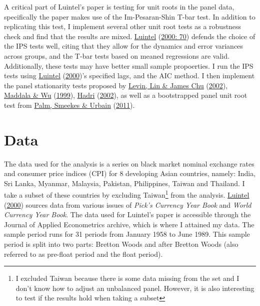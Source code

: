 \documentclass[11pt,preprint, authoryear]{elsarticle}
\numberwithin{equation}{section}
\numberwithin{figure}{section}
\numberwithin{table}{section}
\let\rmarkdownfootnote\footnote%
\def\footnote{\protect\rmarkdownfootnote}
\begin{document}
A critical part of Luintel's paper is testing for unit roots in the
panel data, specifically the paper makes use of the Im-Pesaran-Shin
T-bar test. In addition to replicating this test, I implement several
other unit root tests as a robustness check and find that the results
are mixed. \protect\hyperlink{ref-Kul}{Luintel}
(\protect\hyperlink{ref-Kul}{2000: 70}) defends the choice of the IPS
tests well, citing that they allow for the dynamics and error variances
across groups, and the T-bar tests based on meaned regressions are
valid. Additionally, these tests may have better small sample
propoerties. I run the IPS tests using
\protect\hyperlink{ref-Kul}{Luintel}
(\protect\hyperlink{ref-Kul}{2000})'s specified lags, and the AIC
method. I then implement the panel stationarity tests proposed by
\protect\hyperlink{ref-lev}{Levin, Lin \& James Chu}
(\protect\hyperlink{ref-lev}{2002}), \protect\hyperlink{ref-wu}{Maddala
\& Wu} (\protect\hyperlink{ref-wu}{1999}),
\protect\hyperlink{ref-had}{Hadri} (\protect\hyperlink{ref-had}{2002}),
as well as a bootstrapped panel unit root test from
\protect\hyperlink{ref-pal}{Palm, Smeekes \& Urbain}
(\protect\hyperlink{ref-pal}{2011}).

\hypertarget{data}{%
\section{\texorpdfstring{Data \label{Data}}{Data }}\label{data}}

The data used for the analysis is a series on black market nominal
exchange rates and consumer price indices (CPI) for 8 developing Asian
countries, namely: India, Sri Lanka, Myanmar, Malaysia, Pakistan,
Philippines, Taiwan and Thailand. I take a subset of these countries by
excluding Taiwan\footnote{I excluded Taiwan because there is some data
  missing from the set and I don't know how to adjust an unbalanced
  panel. However, it is also interesting to test if the results hold
  when taking a subset} from the analysis.
\protect\hyperlink{ref-Kul}{Luintel} (\protect\hyperlink{ref-Kul}{2000})
sources data from various issues of \emph{Pick's Currency Year Book} and
\emph{World Currency Year Book}. The data used for Luintel's paper is
accessible through the Journal of Applied Econometrics archive, which is
where I attained my data. The sample period runs for 31 periods from
January 1958 to June 1989. This sample period is split into two parts:
Bretton Woods and after Bretton Woods (also referred to as pre-float
period and the float period).
\end{document}
